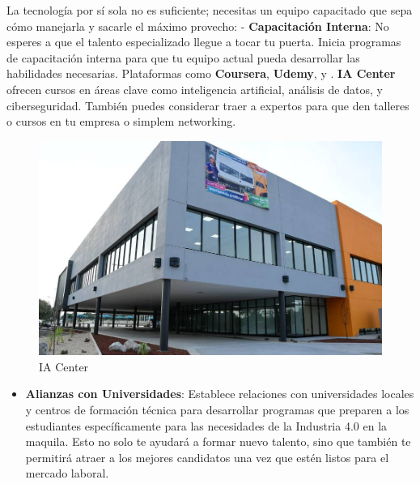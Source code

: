 \documentclass[
  10pt,
  letterpaper,
]{book}
\providecommand{\tightlist}{%
  \setlength{\itemsep}{0pt}\setlength{\parskip}{0pt}}\usepackage{longtable,booktabs,array}
\begin{document}
La tecnología por sí sola no es suficiente; necesitas un equipo
capacitado que sepa cómo manejarla y sacarle el máximo provecho: -
\textbf{Capacitación Interna}: No esperes a que el talento especializado
llegue a tocar tu puerta. Inicia programas de capacitación interna para
que tu equipo actual pueda desarrollar las habilidades necesarias.
Plataformas como \textbf{Coursera}, \textbf{Udemy}, y . \textbf{IA
Center} ofrecen cursos en áreas clave como inteligencia artificial,
análisis de datos, y ciberseguridad. También puedes considerar traer a
expertos para que den talleres o cursos en tu empresa o simplem
networking.

\begin{figure}[H]

{\centering \includegraphics{Img/iacenter.jpeg}

}

\caption{IA Center}

\end{figure}%

\begin{itemize}
\tightlist
\item
  \textbf{Alianzas con Universidades}: Establece relaciones con
  universidades locales y centros de formación técnica para desarrollar
  programas que preparen a los estudiantes específicamente para las
  necesidades de la Industria 4.0 en la maquila. Esto no solo te ayudará
  a formar nuevo talento, sino que también te permitirá atraer a los
  mejores candidatos una vez que estén listos para el mercado laboral.
\end{itemize}
\end{document}
